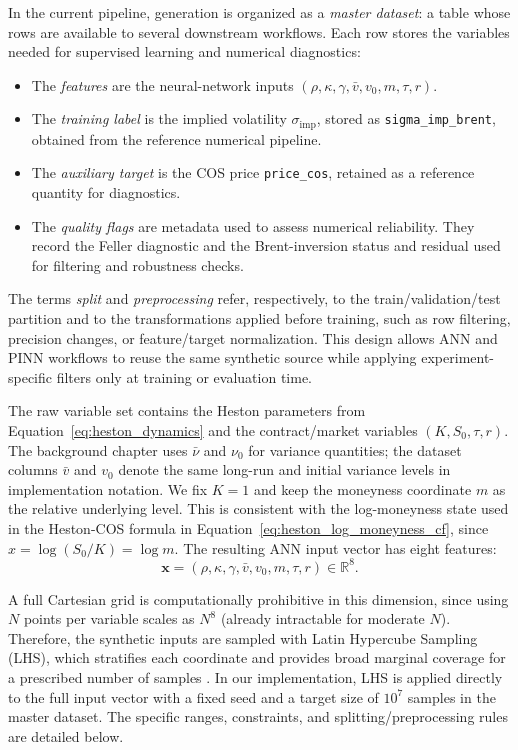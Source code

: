 In the current pipeline, generation is organized as a \emph{master dataset}: a table whose rows are available to several downstream workflows. Each row stores the variables needed for supervised learning and numerical diagnostics:
\begin{itemize}
    \item The \emph{features} are the neural-network inputs $(\rho,\kappa,\gamma,\bar v,v_0,m,\tau,r)$.
    \item The \emph{training label} is the implied volatility $\sigma_{\mathrm{imp}}$, stored as \texttt{sigma\_imp\_brent}, obtained from the reference numerical pipeline.
    \item The \emph{auxiliary target} is the COS price \texttt{price\_cos}, retained as a reference quantity for diagnostics.
    \item The \emph{quality flags} are metadata used to assess numerical reliability. They record the Feller diagnostic and the Brent-inversion status and residual used for filtering and robustness checks.
\end{itemize}
The terms \emph{split} and \emph{preprocessing} refer, respectively, to the train/validation/test partition and to the transformations applied before training, such as row filtering, precision changes, or feature/target normalization. This design allows ANN and PINN workflows to reuse the same synthetic source while applying experiment-specific filters only at training or evaluation time.

The raw variable set contains the Heston parameters from Equation~\eqref{eq:heston_dynamics} and the contract/market variables $(K,S_0,\tau,r)$. The background chapter uses $\bar\nu$ and $\nu_0$ for variance quantities; the dataset columns $\bar v$ and $v_0$ denote the same long-run and initial variance levels in implementation notation. We fix $K=1$ and keep the moneyness coordinate \(m\) as the relative underlying level. This is consistent with the log-moneyness state used in the Heston-COS formula in Equation~\eqref{eq:heston_log_moneyness_cf}, since $x=\log(S_0/K)=\log m$. The resulting ANN input vector has eight features:
\[
\mathbf{x}=(\rho,\kappa,\gamma,\bar v,v_0,m,\tau,r)\in\mathbb{R}^8.
\]

A full Cartesian grid is computationally prohibitive in this dimension, since using $N$ points per variable scales as $N^8$ (already intractable for moderate $N$). Therefore, the synthetic inputs are sampled with Latin Hypercube Sampling (LHS), which stratifies each coordinate and provides broad marginal coverage for a prescribed number of samples \cite{mckay_2000}. In our implementation, LHS is applied directly to the full input vector with a fixed seed and a target size of $10^7$ samples in the master dataset. The specific ranges, constraints, and splitting/preprocessing rules are detailed below.

